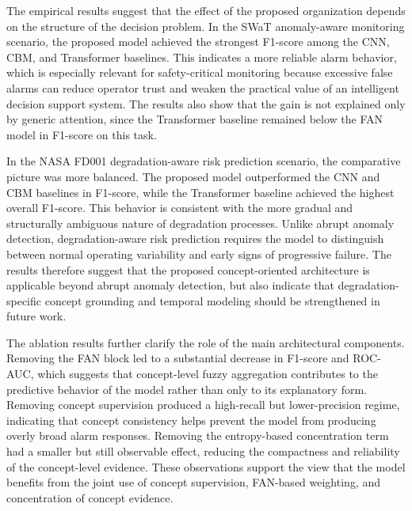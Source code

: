 \documentclass[runningheads]{llncs}
\begin{document}
The empirical results suggest that the effect of the proposed organization depends on the structure of the decision problem. In the SWaT anomaly-aware monitoring scenario, the proposed model achieved the strongest F1-score among the CNN, CBM, and Transformer baselines. This indicates a more reliable alarm behavior, which is especially relevant for safety-critical monitoring because excessive false alarms can reduce operator trust and weaken the practical value of an intelligent decision support system. The results also show that the gain is not explained only by generic attention, since the Transformer baseline remained below the FAN model in F1-score on this task.

In the NASA FD001 degradation-aware risk prediction scenario, the comparative picture was more balanced. The proposed model outperformed the CNN and CBM baselines in F1-score, while the Transformer baseline achieved the highest overall F1-score. This behavior is consistent with the more gradual and structurally ambiguous nature of degradation processes. Unlike abrupt anomaly detection, degradation-aware risk prediction requires the model to distinguish between normal operating variability and early signs of progressive failure. The results therefore suggest that the proposed concept-oriented architecture is applicable beyond abrupt anomaly detection, but also indicate that degradation-specific concept grounding and temporal modeling should be strengthened in future work.

The ablation results further clarify the role of the main architectural components. Removing the FAN block led to a substantial decrease in F1-score and ROC-AUC, which suggests that concept-level fuzzy aggregation contributes to the predictive behavior of the model rather than only to its explanatory form. Removing concept supervision produced a high-recall but lower-precision regime, indicating that concept consistency helps prevent the model from producing overly broad alarm responses. Removing the entropy-based concentration term had a smaller but still observable effect, reducing the compactness and reliability of the concept-level evidence. These observations support the view that the model benefits from the joint use of concept supervision, FAN-based weighting, and concentration of concept evidence.
\end{document}
